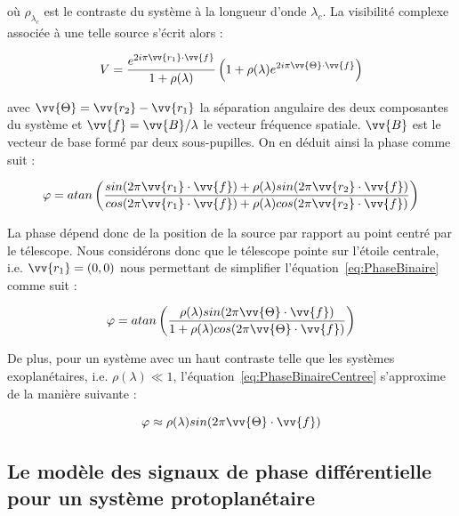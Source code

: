 où $\rho_{\lambda_c}$ est le contraste du système à la longueur d'onde $\lambda_c$. La visibilité complexe associée à une telle source s'écrit alors :

\begin{equation}
    V = \frac{e^{2i\pi \vv{r_1} \cdot \vv{f}}}{1 + \rho(\lambda)} \left( 1 + \rho(\lambda) e^{2i\pi \vv{\Theta} \cdot \vv{f}} \right)
\end{equation}

avec $\vv{\Theta} = \vv{r_2} - \vv{r_1}$ la séparation angulaire des deux composantes du système et $\vv{f} = \vv{B} / \lambda$ le vecteur fréquence spatiale. $\vv{B}$ est le vecteur de base formé par deux sous-pupilles. On en déduit ainsi la phase comme suit :

\begin{equation}
    \varphi = atan \left( \frac{sin(2\pi \vv{r_1} \cdot \vv{f}) + \rho(\lambda) sin(2\pi \vv{r_2} \cdot \vv{f})}{cos(2\pi \vv{r_1} \cdot \vv{f}) + \rho(\lambda) cos(2\pi \vv{r_2} \cdot \vv{f})} \right) \label{eq:PhaseBinaire}
\end{equation}

La phase dépend donc de la position de la source par rapport au point centré par le télescope. Nous considérons donc que le télescope pointe sur l'étoile centrale, i.e. $\vv{r_1} = (0, 0)$ nous permettant de simplifier l'équation~\ref{eq:PhaseBinaire} comme suit :

\begin{equation}
    \varphi = atan \left( \frac{\rho(\lambda) sin(2\pi \vv{\Theta} \cdot \vv{f})}{1 + \rho(\lambda) cos(2\pi \vv{\Theta} \cdot \vv{f})} \right) \label{eq:PhaseBinaireCentree}
\end{equation}

De plus, pour un système avec un haut contraste telle que les systèmes exoplanétaires, i.e. $\rho(\lambda) \ll 1$, l'équation~\ref{eq:PhaseBinaireCentree} s'approxime de la manière suivante :

\begin{equation}
    \varphi \approx \rho(\lambda) sin(2\pi \vv{\Theta} \cdot \vv{f})
    \label{eq:PhaseBinaireHautContraste}
\end{equation}


\subsection{Le modèle des signaux de phase différentielle pour un système protoplanétaire}

